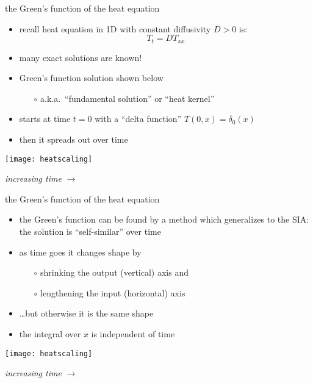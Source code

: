 \begin{frame}{the Green's function of the heat equation}

\begin{itemize}
\item recall heat equation in 1D with constant diffusivity $D>0$ is:
	$$T_t = D T_{xx}$$
\item many exact solutions are known!
\item Green's function solution shown below
  \begin{itemize}
  \item[$\circ$] a.k.a.~``fundamental solution'' or ``heat kernel''
  \end{itemize}
\item starts at time $t=0$ with a ``delta function'' $T(0,x)=\delta_0(x)$
\item then it spreads out over time
\end{itemize}

\begin{center}
\texttt{[image: heatscaling]}

\emph{increasing time} \Large $\to$
\end{center}
\end{frame}


\begin{frame}{the Green's function of the heat equation }

\begin{itemize}
\item the Green's function can be found by a method which generalizes to the SIA: the solution is ``self-similar'' over time
\item as time goes it changes shape by
  \begin{itemize}
  \item[$\circ$] shrinking the output (vertical) axis and
  \item[$\circ$] lengthening the input (horizontal) axis
  \end{itemize}
\item \dots but otherwise it is the same shape
\item the integral over $x$ is independent of time
\end{itemize}

\begin{center}
\texttt{[image: heatscaling]}

\emph{increasing time} \Large $\to$
\end{center}
\end{frame}


